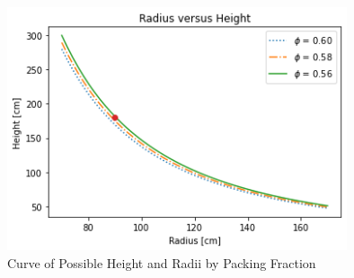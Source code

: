 \begin{figure}[h!]
\centering
\includegraphics[width = 10cm]{figures/act-core-RH.png}
\caption{Curve of Possible Height and Radii by Packing Fraction}
\label{fig:rh-vol}
\end{figure}